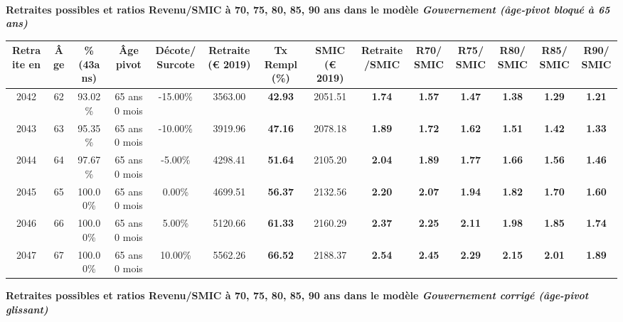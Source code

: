  ~\\{\bf \noindent Retraites possibles et ratios Revenu/SMIC à 70, 75, 80, 85, 90 ans dans le modèle \emph{Gouvernement (âge-pivot bloqué à 65 ans)}}  
 
\begin{adjustbox}{max width=\textwidth} 
\begin{tabular}[htb]{|c|c||c|c|c||c|c||c|c||c|c|c|c|c|} 
\hline 
 Retraite en &  Âge &  \%(43ans) &  Âge pivot &  Décote/Surcote &  Retraite (\euro{} 2019) &  Tx Rempl(\%) &  SMIC (\euro{} 2019) &  Retraite/SMIC &  R70/SMIC &  R75/SMIC &  R80/SMIC &  R85/SMIC &  R90/SMIC \\ 
\hline \hline 
 2042 &  62 &  93.02\% &  65 ans 0 mois &  -15.00\% &  3563.00 &  {\bf 42.93} &  2051.51 &  {\bf 1.74} &  {\bf 1.57} &  {\bf 1.47} &  {\bf 1.38} &  {\bf 1.29} &  {\bf 1.21} \\ 
\hline 
 2043 &  63 &  95.35\% &  65 ans 0 mois &  -10.00\% &  3919.96 &  {\bf 47.16} &  2078.18 &  {\bf 1.89} &  {\bf 1.72} &  {\bf 1.62} &  {\bf 1.51} &  {\bf 1.42} &  {\bf 1.33} \\ 
\hline 
 2044 &  64 &  97.67\% &  65 ans 0 mois &  -5.00\% &  4298.41 &  {\bf 51.64} &  2105.20 &  {\bf 2.04} &  {\bf 1.89} &  {\bf 1.77} &  {\bf 1.66} &  {\bf 1.56} &  {\bf 1.46} \\ 
\hline 
 2045 &  65 &  100.00\% &  65 ans 0 mois &  0.00\% &  4699.51 &  {\bf 56.37} &  2132.56 &  {\bf 2.20} &  {\bf 2.07} &  {\bf 1.94} &  {\bf 1.82} &  {\bf 1.70} &  {\bf 1.60} \\ 
\hline 
 2046 &  66 &  100.00\% &  65 ans 0 mois &  5.00\% &  5120.66 &  {\bf 61.33} &  2160.29 &  {\bf 2.37} &  {\bf 2.25} &  {\bf 2.11} &  {\bf 1.98} &  {\bf 1.85} &  {\bf 1.74} \\ 
\hline 
 2047 &  67 &  100.00\% &  65 ans 0 mois &  10.00\% &  5562.26 &  {\bf 66.52} &  2188.37 &  {\bf 2.54} &  {\bf 2.45} &  {\bf 2.29} &  {\bf 2.15} &  {\bf 2.01} &  {\bf 1.89} \\ 
\hline 
\hline 
\end{tabular} 
\end{adjustbox} 
 
 \vspace{0.1cm} 
{\bf \noindent Retraites possibles et ratios Revenu/SMIC à 70, 75, 80, 85, 90 ans dans le modèle \emph{Gouvernement corrigé (âge-pivot glissant)}}  
 
